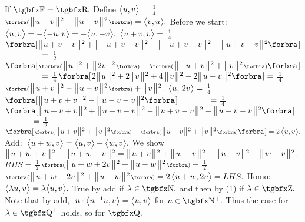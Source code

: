 \ProblemN{21}{
	\TextA{Implement the corres inner prod from a norm $\Dvert{{\cdot}}:U\rightarrow\Interval{[}{)}{0,\infty}$ satisfying [6.22].\vspace{2pt}}
}If $\Fbb=\Rbb.$ Define $\big\langle{}u,v{}\big\rangle={}${\Large$\frac{\:1\:}{4}$}$\BigPar{\Dvertsq{u+v}-\Dvertsq{u-v}}=\Ang{v,u}.$ \;Before we start:\def\Lbreak{1pt}\def\LBREAK{6pt}\def\Endl{\vspace{\Lbreak}\parSol{}}\def\ENDL{\vspace{\LBREAK}\parSol{}}\vspace{2pt}\parSol{}
 $\big\langle{}u,v{}\big\rangle=-\big\langle{}{-u,v}{}\big\rangle=-\big\langle{}u,-v{}\big\rangle.$\Endl{}
 $\big\langle{}u+v,v{}\big\rangle={}${\Large$\frac{\:1\:}{4}$}$\BigSbra{\Dvertsq{u+v+v}+\Dvertsq{{-u+v+v}}-\Dvertsq{{-u+v+v}}-\Dvertsq{u+v-v}}$\Endl{}
 $\Blind{\Ang{u+v,v}}={}${\Large$\frac{\:1\:}{2}$}$\BigSbra{\BigPar{\Dvertsq{u}+\Dvertsq{2v}}-\BigPar{\Dvertsq{{-u+v}}+\Dvertsq{v}}}$\Endl{}
 $\Blind{\Ang{u+v,v}}={}${\Large$\frac{\:1\:}{4}$}$\BigSbra{2\Dvertsq{u}+2\Dvertsq{v}+4\,\Dvertsq{v}-2\Dvertsq{u-v}}={}${\Large$\frac{\:1\:}{4}$}$\BigPar{\Dvertsq{u+v}-\Dvertsq{u-v}}+\Dvertsq{v}.$\ENDL{}
 $\big\langle{}u,\,2v{}\big\rangle={}${\Large$\frac{\:1\:}{4}$}$\BigSbra{\Dvertsq{u+v+v}-\Dvertsq{u-v-v}}$\Endl{}
 $\Blind{\Ang{u,\,2v}}={}${\Large$\frac{\:1\:}{4}$}$\BigSbra{\Dvertsq{u+v+v}+\Dvertsq{u+v-v}-\Dvertsq{u+v-v}-\Dvertsq{u-v-v}}$\Endl{}
 $\Blind{\Ang{u,\,2v}}={}${\Large$\frac{\:1\:}{2}$}$\BigSbra{\BigPar{\Dvertsq{u+v}+\Dvertsq{v}}-\BigPar{\Dvertsq{u-v}+\Dvertsq{v}}}=2\,\Ang{u,v}.$\ENDL{}
{\tgbf Add:} \,$\big\langle{}u+w,v{}\big\rangle=\big\langle{}u,v{}\big\rangle+\big\langle{}w,v{}\big\rangle.$\Endl{}
We show \:$\big\Vert\hspace{1pt}{}u+w+v{}\hspace{1pt}\big\Vert{\hspace{0.5pt}}{^2}-\big\Vert\hspace{1pt}{}u+w-v{}\hspace{1pt}\big\Vert{\hspace{0.5pt}}{^2}=\big\Vert\hspace{1pt}{}u+v{}\hspace{1pt}\big\Vert{\hspace{0.5pt}}{^2}+\big\Vert\hspace{1pt}{}w+v{}\hspace{1pt}\big\Vert{\hspace{0.5pt}}{^2}-\big\Vert\hspace{1pt}{}u-v{}\hspace{1pt}\big\Vert{\hspace{0.5pt}}{^2}-\big\Vert\hspace{1pt}{}w-v{}\hspace{1pt}\big\Vert{\hspace{0.5pt}}{^2}.$\Endl{}
$RHS={}${\Large$\frac{\:1\:}{2}$}$\BigPar{\Dvertsq{u+w+2v}+\Dvertsq{u-w}}-{}${\Large$\frac{\:1\:}{2}$}$\BigPar{\Dvertsq{u+w-2v}+\Dvertsq{u-w}}=2\,\Ang{u+w,2v}=LHS.$\ENDL{}
{\tgbf Homo:} \,$\big\langle{}\lambda u,v{}\big\rangle=\lambda\big\langle{}u,v{}\big\rangle.$ \;True by add if $\lambda\in\Nbb,$ and then by (1) if $\lambda\in\Zbb.$\Endl{}
Note that by add, $\;n\cdot\big\langle{}n^{-1}u,v{}\big\rangle=\big\langle{}u,v{}\big\rangle$ for $n\in\Nbp.$ Thus the case for $\lambda\in\Qbb^+$ holds, so for $\Qbb$.\Endl{}
